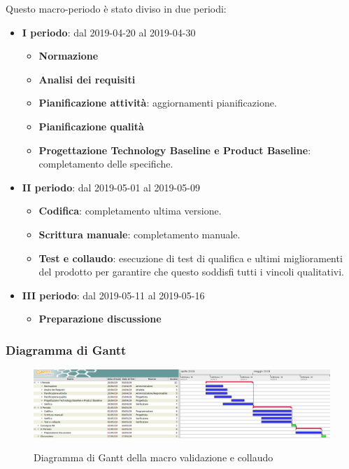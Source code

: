         Questo macro-periodo è stato diviso in due periodi:
		\begin{itemize}
			\item \textbf{I periodo}: dal 2019-04-20 al 2019-04-30
			\begin{itemize}
    	        \item \textbf{Normazione}
    	        \item \textbf{Analisi dei requisiti}
    	        \item \textbf{Pianificazione attività}: aggiornamenti pianificazione.
    	        \item \textbf{Pianificazione qualità}
    	        \item \textbf{Progettazione Technology Baseline e Product Baseline}: completamento delle specifiche.
        	\end{itemize}
			\item \textbf{II periodo}: dal 2019-05-01 al 2019-05-09
			\begin{itemize}
    	        \item \textbf{Codifica}: completamento ultima versione.
    	        \item \textbf{Scrittura manuale}: completamento manuale.
    	        \item \textbf{Test e collaudo}: esecuzione di test di qualifica e ultimi miglioramenti del prodotto per
    	        garantire che questo soddisfi tutti i vincoli qualitativi.
			\end{itemize}
			\item \textbf{III periodo}: dal 2019-05-11 al 2019-05-16
			\begin{itemize}
				\item \textbf{Preparazione discussione}
			\end{itemize}
		\end{itemize}

        \begin{landscape}
			\subsubsection{Diagramma di Gantt}
			\begin{figure}[H]
					\centering
					\includegraphics[scale=0.42]{img/Validazione_e_collaudo.png}\\
					\caption{Diagramma di Gantt della macro validazione e collaudo}
			\end{figure}
		\end{landscape}
		\newpage
